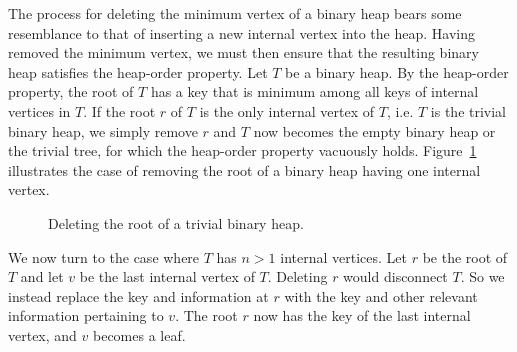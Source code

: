 The process for deleting the minimum vertex of a binary heap bears
some resemblance to that of inserting a new internal vertex into the
heap. Having removed the minimum vertex, we must then ensure that the
resulting binary heap satisfies the heap-order property. Let $T$ be a
binary heap. By the heap-order property, the root of $T$ has a key
that is minimum among all keys of internal vertices in $T$. If the
root $r$ of $T$ is the only internal vertex of $T$, i.e. $T$ is the
trivial binary heap, we simply remove $r$ and $T$ now becomes the
empty binary heap or the trivial tree, for which the heap-order
property vacuously holds.
Figure~\ref{fig:tree_data_structures:deleting_root_trivial_binary_heap}
illustrates the case of removing the root of a binary heap having one
internal vertex.

\begin{figure}[!htbp]
\centering
{}
\qquad
{}
\caption{Deleting the root of a trivial binary heap.}
\label{fig:tree_data_structures:deleting_root_trivial_binary_heap}
\end{figure}

We now turn to the case where $T$ has $n > 1$ internal vertices. Let
$r$ be the root of $T$ and let $v$ be the last internal vertex of
$T$. Deleting $r$ would disconnect $T$. So we instead replace the key
and information at $r$ with the key and other relevant information
pertaining to $v$. The root $r$ now has the key of the last internal
vertex, and $v$ becomes a leaf.

